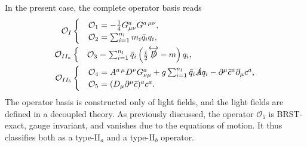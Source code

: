 In the present case, the complete operator basis reads
\begin{equation}
\begin{split}
\mathcal{O}_{I} &\begin{cases} &\mathcal{O}_1 = -\frac{1}{4} G^a_{\mu \nu} G^{a\, \mu\nu}, \\
&\mathcal{O}_2 = \sum_{i=1}^{n_l} m_i \bar{q}_i q_i, \end{cases} \\
\mathcal{O}_{II_a} &\begin{cases} &\mathcal{O}_3 = \sum_{i=1}^{n_l} \bar{q}_i \left( \frac{i}{2} \overleftrightarrow{\slashed{D}} - m \right) q_i, \end{cases} \\
\mathcal{O}_{II_b} &\begin{cases} &\mathcal{O}_4 = A^{a\, \mu} D^\nu G_{\nu\mu}^a + g \sum_{i=1}^{n_l} \bar{q}_i \slashed{A} q_i - \partial^\mu \bar{c}^a \partial_\mu c^a, \\
&\mathcal{O}_5 = (D_\mu \partial^\mu \bar{c})^a c^a. \end{cases}
\end{split}
\label{eq:4:operators}
\end{equation}
The operator basis is constructed only of light fields, and the light fields are defined in a decoupled theory. As previously discussed, the operator $\mathcal{O}_5$ is BRST-exact, gauge invariant, and vanishes due to the equations of motion. It thus classifies both as a type-II${}_a$ and a type-II${}_b$ operator.

